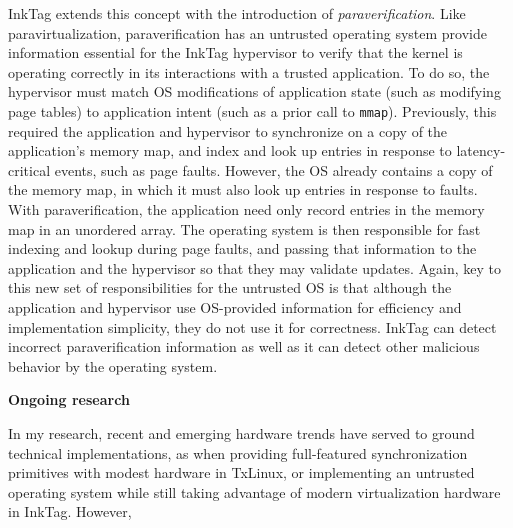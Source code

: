 \documentclass{article}
\newcommand{\inktag}{InkTag\xspace}
\newcommand{\codeid}[1]{{\fontsize{9pt}{12pt}\tt #1}}
\begin{document}
\inktag extends this concept with the introduction of
\emph{paraverification}. Like paravirtualization, paraverification has an
untrusted operating system provide information essential for the \inktag
hypervisor to verify that the kernel is operating correctly in its
interactions with a trusted application. To do so, the hypervisor must
match OS modifications of application state (such as modifying page tables) to
application intent (such as a prior call to \codeid{mmap}). Previously, this
required the application and hypervisor to synchronize on a copy of the
application's memory map, and index and look up entries in response to
latency-critical events, such as page faults. However, the OS already
contains a copy of the memory map, in which it must also look up entries in
response to faults. With paraverification, the application need only record
entries in the memory map in an unordered array. The operating system is
then responsible for fast indexing and lookup during page faults, and
passing that information to the application and the hypervisor so that they
may validate updates. Again, key to this new set of responsibilities for
the untrusted OS is that although the application and hypervisor use
OS-provided information for efficiency and implementation simplicity, they
do not use it for correctness. \inktag can detect incorrect
paraverification information as well as it can detect other malicious
behavior by the operating system.

{\bigskip \noindent \bf Ongoing research}

\noindent
In my research, recent and emerging hardware trends have served to ground
technical implementations, as when providing full-featured synchronization
primitives with modest hardware in TxLinux, or implementing an untrusted
operating system while still taking advantage of modern virtualization
hardware in \inktag. However, 
\end{document}
